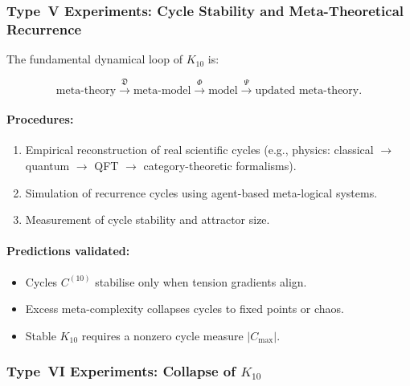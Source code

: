 \subsubsection{Type~V Experiments: Cycle Stability and Meta-Theoretical Recurrence}

The fundamental dynamical loop of $K_{10}$ is:

\[
\text{meta-theory} 
   \xrightarrow{\mathfrak{D}}
\text{meta-model}
   \xrightarrow{\Phi}
\text{model}
   \xrightarrow{\Psi}
\text{updated meta-theory}.
\]

\paragraph{Procedures:}

\begin{enumerate}
    \item Empirical reconstruction of real scientific cycles 
          (e.g., physics: classical $\to$ quantum $\to$ QFT $\to$ 
          category-theoretic formalisms).
    \item Simulation of recurrence cycles using agent-based meta-logical 
          systems.
    \item Measurement of cycle stability and attractor size.
\end{enumerate}

\paragraph{Predictions validated:}

\begin{itemize}
    \item Cycles $C^{(10)}$ stabilise only when tension gradients align.
    \item Excess meta-complexity collapses cycles to fixed points or chaos.
    \item Stable $K_{10}$ requires a nonzero cycle measure $|C_{\max}|$.
\end{itemize}



\subsubsection{Type~VI Experiments: Collapse of $K_{10}$}

